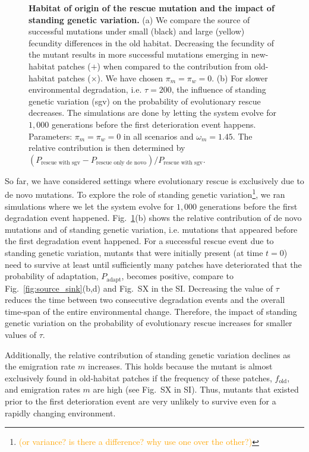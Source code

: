 \documentclass[a4paper,11pt]{article}
\newcommand{\pete}[1]{\textcolor{orange}{(#1)}}
\newcommand{\chg}[1]{\textcolor{change}{#1}}
\begin{document}
\begin{figure}[t]
	\caption{\textbf{Habitat of origin of the rescue mutation and the impact of standing genetic variation.} \small (a) We compare the source of successful mutations under small (black) and large (yellow) fecundity differences in the old habitat. Decreasing the fecundity of the mutant results in more successful mutations emerging in new-habitat patches ($+$) when compared to the contribution from old-habitat patches ($\times$). We have chosen $\pi_m=\pi_w=0$. (b) For slower environmental degradation, i.e. $\tau=200$, the influence of standing genetic variation (sgv) on the probability of evolutionary rescue decreases. The simulations are done by letting the system evolve for $1,000$ generations before the first deterioration event happens. Parameters: $\pi_m=\pi_w=0$ in all scenarios and $\omega_m=1.45$. The relative contribution is then determined by $(P_{\text{rescue with sgv}}-P_{\text{rescue only de novo}})/P_{\text{rescue with sgv}}$.}
	\label{fig:sgv}
\end{figure}

So far, we have considered settings where evolutionary rescue is exclusively due to de novo mutations. To explore the role of standing genetic variation\footnote{\pete{or variance? is there a difference? why use one over the other?}}, we ran simulations where we let the system evolve for $1,000$ generations before the first degradation event happened. Fig.~\ref{fig:sgv}(b) shows the relative contribution of de novo mutations and of standing genetic variation, i.e. mutations that appeared before the first degradation event happened. \chg{For a successful rescue event due to standing genetic variation, mutants that were initially present (at time $t=0$) need to survive at least until sufficiently many patches have deteriorated that the probability of adaptation, $P_{\text{adapt}}$, becomes positive, compare to Fig.~\ref{fig:source_sink}(b,d) and Fig.~SX in the SI.} \chg{Decreasing the value of $\tau$ reduces the time between two consecutive degradation events and the overall time-span of the entire environmental change. Therefore, the impact of standing genetic variation on the probability of evolutionary rescue increases for smaller values of $\tau$.}

Additionally, the relative contribution of standing genetic variation declines as the emigration rate $m$ increases. 
This holds because \chg{the mutant is almost exclusively found in old-habitat patches if the frequency of these patches, $f_{\text{old}}$, and emigration rates $m$ are high} (see Fig.~SX in SI). Thus, mutants that existed prior to the first deterioration event are very unlikely to survive even for a rapidly changing environment. 
\end{document}
